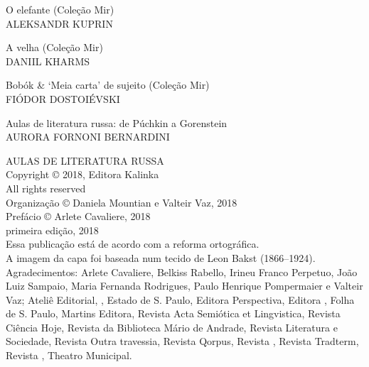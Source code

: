 \noindent{}O elefante (Coleção Mir)\\
ALEKSANDR KUPRIN
\medskip

\noindent{}A velha (Coleção Mir)\\
DANIIL KHARMS 
\medskip

\noindent{}Bobók \& `Meia carta' de sujeito (Coleção Mir)\\
FIÓDOR DOSTOIÉVSKI
\medskip

\noindent{}Aulas de literatura russa: de Púchkin a Gorenstein \\
AURORA FORNONI BERNARDINI

\newpage
\pagestyle{empty}
\MyriadPro
\scriptsize
\begin{center}
AULAS DE LITERATURA RUSSA\\[6pt]

Copyright © 2018, Editora Kalinka\\[6pt]

All rights reserved\\[20pt]

Organização © Daniela Mountian e Valteir Vaz, 2018\\[6pt]

Prefácio © Arlete Cavaliere, 2018\\[6pt]

primeira edição, 2018\\[40pt]


Essa publicação está de acordo com a reforma ortográfica.\\[6pt]
A imagem da capa foi baseada num tecido de Leon Bakst (1866--1924).\\[6pt]	
Agradecimentos: Arlete Cavaliere, Belkiss Rabello, Irineu Franco Perpetuo, João Luiz Sampaio, Maria Fernanda Rodrigues, Paulo Henrique Pompermaier e Valteir Vaz; Ateliê Editorial, , Estado de S. Paulo, Editora Perspectiva, Editora , Folha de S. Paulo, Martins Editora, Revista Acta Semiótica et Lingvistica, Revista Ciência Hoje, Revista da Biblioteca Mário de Andrade, Revista Literatura e Sociedade, Revista Outra travessia, Revista Qorpus, Revista , Revista Tradterm, Revista , Theatro Municipal.\\[20pt]
\end{center}


\bigskip

